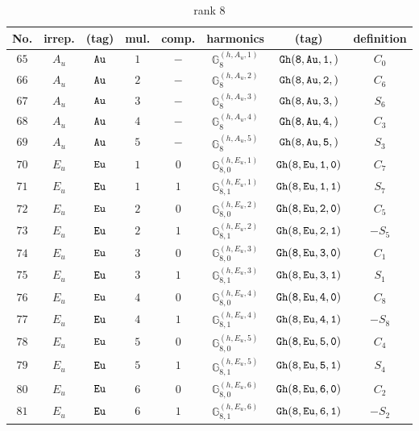 \documentclass[fleqn,8pt]{jsarticle}
\begin{document}
\begin{table}[ht!]
\begin{center}
\caption{rank 8}
\renewcommand{\arraystretch}{1.3}
\begin{tabular}{cccccccc} \hline \hline
No. & irrep. & (tag) & mul. & comp. & harmonics & (tag) & definition \\ \hline
$ 65 $ & $ A_{u} $ & $ {\tt Au} $ & $ 1 $ & $ - $ & $ \mathbb{G}_{8}^{(h,A_{u},1)} $ & $ {\tt Gh(8,Au,1,)} $ & $ C_{0} $ \\
$ 66 $ & $ A_{u} $ & $ {\tt Au} $ & $ 2 $ & $ - $ & $ \mathbb{G}_{8}^{(h,A_{u},2)} $ & $ {\tt Gh(8,Au,2,)} $ & $ C_{6} $ \\
$ 67 $ & $ A_{u} $ & $ {\tt Au} $ & $ 3 $ & $ - $ & $ \mathbb{G}_{8}^{(h,A_{u},3)} $ & $ {\tt Gh(8,Au,3,)} $ & $ S_{6} $ \\
$ 68 $ & $ A_{u} $ & $ {\tt Au} $ & $ 4 $ & $ - $ & $ \mathbb{G}_{8}^{(h,A_{u},4)} $ & $ {\tt Gh(8,Au,4,)} $ & $ C_{3} $ \\
$ 69 $ & $ A_{u} $ & $ {\tt Au} $ & $ 5 $ & $ - $ & $ \mathbb{G}_{8}^{(h,A_{u},5)} $ & $ {\tt Gh(8,Au,5,)} $ & $ S_{3} $ \\
$ 70 $ & $ E_{u} $ & $ {\tt Eu} $ & $ 1 $ & $ 0 $ & $ \mathbb{G}_{8,0}^{(h,E_{u},1)} $ & $ {\tt Gh(8,Eu,1,0)} $ & $ C_{7} $ \\
$ 71 $ & $ E_{u} $ & $ {\tt Eu} $ & $ 1 $ & $ 1 $ & $ \mathbb{G}_{8,1}^{(h,E_{u},1)} $ & $ {\tt Gh(8,Eu,1,1)} $ & $ S_{7} $ \\
$ 72 $ & $ E_{u} $ & $ {\tt Eu} $ & $ 2 $ & $ 0 $ & $ \mathbb{G}_{8,0}^{(h,E_{u},2)} $ & $ {\tt Gh(8,Eu,2,0)} $ & $ C_{5} $ \\
$ 73 $ & $ E_{u} $ & $ {\tt Eu} $ & $ 2 $ & $ 1 $ & $ \mathbb{G}_{8,1}^{(h,E_{u},2)} $ & $ {\tt Gh(8,Eu,2,1)} $ & $ - S_{5} $ \\
$ 74 $ & $ E_{u} $ & $ {\tt Eu} $ & $ 3 $ & $ 0 $ & $ \mathbb{G}_{8,0}^{(h,E_{u},3)} $ & $ {\tt Gh(8,Eu,3,0)} $ & $ C_{1} $ \\
$ 75 $ & $ E_{u} $ & $ {\tt Eu} $ & $ 3 $ & $ 1 $ & $ \mathbb{G}_{8,1}^{(h,E_{u},3)} $ & $ {\tt Gh(8,Eu,3,1)} $ & $ S_{1} $ \\
$ 76 $ & $ E_{u} $ & $ {\tt Eu} $ & $ 4 $ & $ 0 $ & $ \mathbb{G}_{8,0}^{(h,E_{u},4)} $ & $ {\tt Gh(8,Eu,4,0)} $ & $ C_{8} $ \\
$ 77 $ & $ E_{u} $ & $ {\tt Eu} $ & $ 4 $ & $ 1 $ & $ \mathbb{G}_{8,1}^{(h,E_{u},4)} $ & $ {\tt Gh(8,Eu,4,1)} $ & $ - S_{8} $ \\
$ 78 $ & $ E_{u} $ & $ {\tt Eu} $ & $ 5 $ & $ 0 $ & $ \mathbb{G}_{8,0}^{(h,E_{u},5)} $ & $ {\tt Gh(8,Eu,5,0)} $ & $ C_{4} $ \\
$ 79 $ & $ E_{u} $ & $ {\tt Eu} $ & $ 5 $ & $ 1 $ & $ \mathbb{G}_{8,1}^{(h,E_{u},5)} $ & $ {\tt Gh(8,Eu,5,1)} $ & $ S_{4} $ \\
$ 80 $ & $ E_{u} $ & $ {\tt Eu} $ & $ 6 $ & $ 0 $ & $ \mathbb{G}_{8,0}^{(h,E_{u},6)} $ & $ {\tt Gh(8,Eu,6,0)} $ & $ C_{2} $ \\
$ 81 $ & $ E_{u} $ & $ {\tt Eu} $ & $ 6 $ & $ 1 $ & $ \mathbb{G}_{8,1}^{(h,E_{u},6)} $ & $ {\tt Gh(8,Eu,6,1)} $ & $ - S_{2} $ \\
 \hline \hline
\end{tabular}
\end{center}
\end{table}
\end{document}
